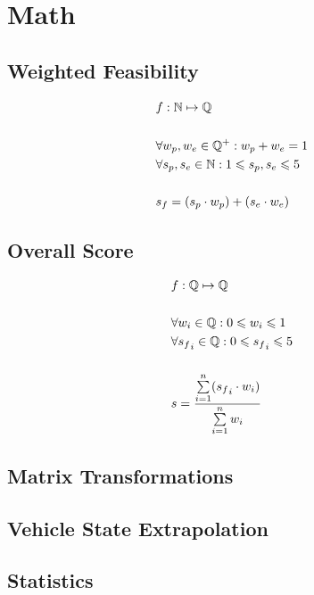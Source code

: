 \chapter{Math}\label{ax:math}

\section{Weighted Feasibility}\label{ax:math:feasibility}

\begin{align*}
    &f: \mathbb{N} \mapsto \mathbb{Q} \\
    \\
    &\forall w_p,w_e \in \mathbb{Q}^+: w_p + w_e = 1 \\
    &\forall s_p,s_e \in \mathbb{N}: 1 \leqslant s_p,s_e \leqslant 5 \\
    \\
    &s_f = (s_p \cdot w_p) + (s_e \cdot w_e) \\
\end{align*}

\section{Overall Score}\label{ax:math:mean}

\begin{align*}
    &f: \mathbb{Q} \mapsto \mathbb{Q} \\
    \\
    &\forall w_i \in \mathbb{Q}:0 \leqslant w_i \leqslant 1 \\
    &\forall {s_f}_i \in \mathbb{Q}:0 \leqslant {s_f}_i \leqslant 5 \\
    \\
    &s = \frac{\sum\limits_{i=1}^{n}({s_f}_i \cdot w_i)}{\sum\limits_{i=1}^{n}w_i} \\
\end{align*}

\section{Matrix Transformations}\label{ax:math:matrix}


\section{Vehicle State Extrapolation}\label{ax:math:extrapolation}


\section{Statistics}\label{ax:math:statistics}

